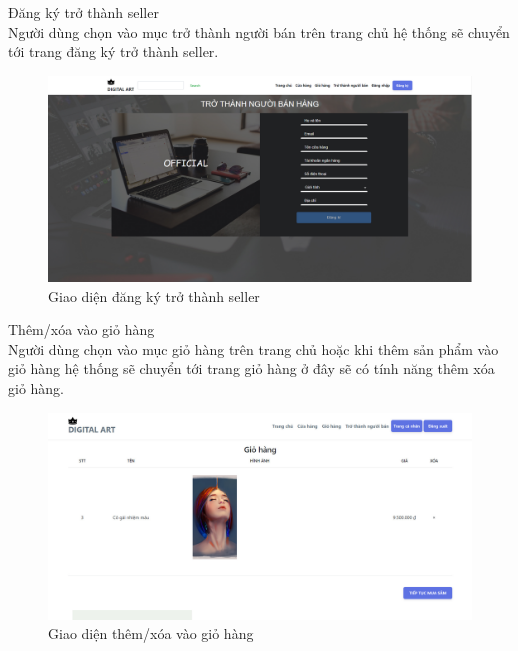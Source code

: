 \documentclass{article}
\begin{document}
{{{{{{{{{{{{{{{{{\begin{center}
\begin{figure}[htp]
		\end{figure}
	\end{center}
}
\newpage
{\large 
	\indent	Đăng ký trở thành seller\\
		{\large
		Người dùng chọn vào mục trở thành người bán trên trang chủ hệ thống sẽ chuyển tới trang đăng ký trở thành seller.}
	\begin{center}
		\begin{figure}[htp]
			\begin{center}
				\includegraphics[scale=.350]{anh33.png}
			\end{center}
			\caption{Giao diện đăng ký trở thành seller}
			
		\end{figure}
	\end{center}
}

\newpage
{\large 
	\indent	Thêm/xóa vào giỏ hàng\\
	{\large
		Người dùng chọn vào mục giỏ hàng  trên trang chủ hoặc khi thêm sản phẩm vào giỏ hàng hệ thống sẽ chuyển tới trang giỏ hàng ở đây sẽ có tính năng thêm xóa giỏ hàng.}
	\begin{center}
		\begin{figure}[htp]
			\begin{center}
				\includegraphics[scale=.250]{anh33.jpg}
			\end{center}
			\caption{Giao diện thêm/xóa vào giỏ hàng}
			

\end{figure}
\end{center}}}}}}}}}}}}}}}}}}
\end{document}
